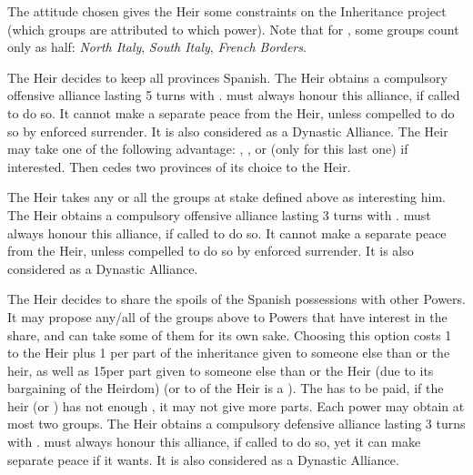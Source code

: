 \aparag The attitude chosen gives the Heir some constraints on the Inheritance
project (which groups are attributed to which power).
\bparag Note that for \AUS, some groups count only as half: \emph{North
  Italy}, \emph{South Italy}, \emph{French Borders}.

\begin{digressions}
  \bgroup{}


  \aparag The Heir decides to keep all provinces Spanish.
  \aparag The Heir obtains a compulsory offensive alliance lasting 5 turns
  with \SPA. \SPA must always honour this alliance, if called to do so. It
  cannot make a separate peace from the Heir, unless compelled to do so by
  enforced surrender. It is also considered as a Dynastic Alliance.
  \aparag The Heir may take one of the following advantage: , ,  or  (\AUS only for this last one) if
  interested.
  \aparag Then \SPA cedes two provinces of its choice to the Heir.


  \aparag The Heir takes any or all the groups at stake defined above as
  interesting him.
  \aparag The Heir obtains a compulsory offensive alliance lasting 3 turns
  with \SPA. \SPA must always honour this alliance, if called to do so. It
  cannot make a separate peace from the Heir, unless compelled to do so by
  enforced surrender. It is also considered as a Dynastic Alliance.


  \aparag The Heir decides to share the spoils of the Spanish possessions with
  other Powers. It may propose any/all of the groups above to Powers that have
  interest in the share, and can take some of them for its own sake.
  \bparag Choosing this option costs 1 \STAB to the Heir plus 1 \STAB per part
  of the inheritance given to someone else than \HIS or the heir, as well as
  15\VPs per part given to someone else than \HIS or the Heir (due to its
  bargaining of the Heirdom) (or to \SPA of the Heir is a \MIN). The \STAB has
  to be paid, if the heir (or \HIS) has not enough \STAB, it may not give more
  parts.
  \bparag Each power may obtain at most two groups.
  \aparag The Heir obtains a compulsory defensive alliance lasting 3 turns
  with \SPA.  \SPA must always honour this alliance, if called to do so, yet
  it can make separate peace if it wants. It is also considered as a Dynastic
  Alliance.
  \egroup
\end{digressions}

